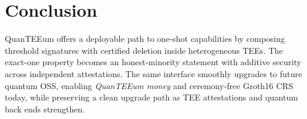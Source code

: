 \documentclass[runningheads,orivec]{llncs}
\newcommand{\prot}{\textsf{QuanTEEum}}
\begin{document}
\section{Conclusion}
\prot{} offers a deployable path to one-shot capabilities by composing threshold signatures with certified deletion inside heterogeneous TEEs. The exact-one property becomes an honest-minority statement with additive security across independent attestations. The same interface smoothly upgrades to future quantum OSS, enabling \emph{QuanTEEum money} and ceremony-free Groth16 CRS today, while preserving a clean upgrade path as TEE attestations and quantum back ends strengthen.



\end{document}
